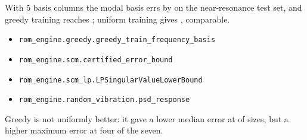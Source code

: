 \newpage\thispagestyle{hl}
\par
{}
\begin{hlheadline}With 5 basis columns the modal basis errs by \cfrModalNearFive{} on the near-resonance test set, and greedy training reaches \cfrGreedyNearFive; uniform training gives \cfrUniformNearFive, comparable.\end{hlheadline}
{\begin{itemize}\setlength\itemsep{2pt}
\item \texttt{rom\_engine.greedy.greedy\_train\_frequency\_basis}
\item \texttt{rom\_engine.scm.certified\_error\_bound}
\item \texttt{rom\_engine.scm\_lp.LPSingularValueLowerBound}
\item \texttt{rom\_engine.random\_vibration.psd\_response}
\end{itemize}}
\begin{hllimit}Greedy is not uniformly better: it gave a lower median error at \cfrGreedyWinsMed{} of \cfrRankCount{} sizes, but a higher maximum error at four of the seven.\end{hllimit}
